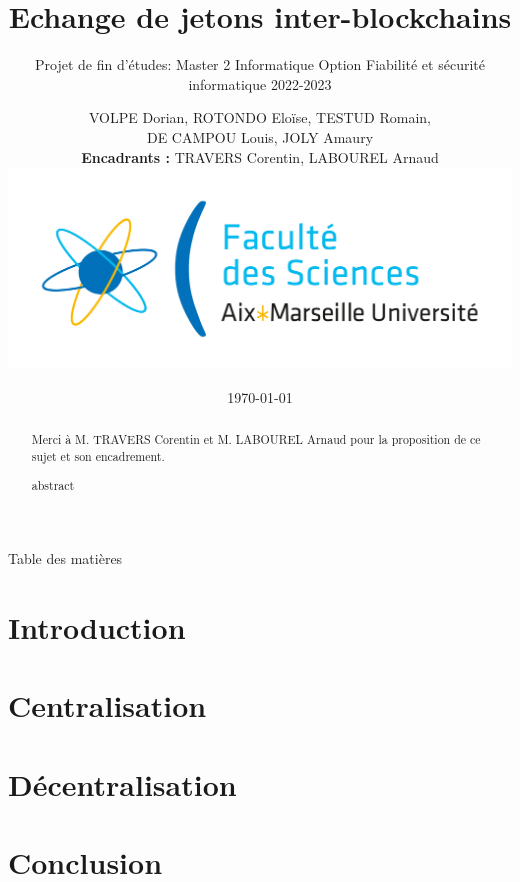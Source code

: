 \documentclass{beamer}
\title[Swap Cross-Blockchain]{Echange de jetons inter-blockchains}
\subtitle{Projet de fin d'études: Master 2 Informatique Option Fiabilité et sécurité informatique 2022-2023}
\author[M2 FSI]{VOLPE Dorian, ROTONDO Eloïse, TESTUD Romain,\\DE CAMPOU Louis, JOLY Amaury  \\ \textbf{Encadrants :} TRAVERS Corentin, LABOUREL Arnaud \\[2ex] \includegraphics[scale=0.1]{./img/amu.png}}
\institute[Aix-Marseille Université]{M2 Fiabilité et sécurité informatique}
\date{\today}
\newenvironment*{remerciements}{%
  \renewcommand*{\abstractname}{Remerciements}
  \begin{abstract}
}{
  \end{abstract}
}
\begin{document}
\maketitle

\begin{frame}
  \begin{remerciements}
    Merci à M. TRAVERS Corentin et M. LABOUREL Arnaud pour la proposition de ce sujet et son encadrement.
  \end{remerciements}
  \begin{abstract}
    abstract
  \end{abstract}
\end{frame}

\begin{frame}{Table des matières}
  \tableofcontents
\end{frame}

\section{Introduction}

\section{Centralisation}

\section{Décentralisation}

\section{Conclusion}

\end{document}
